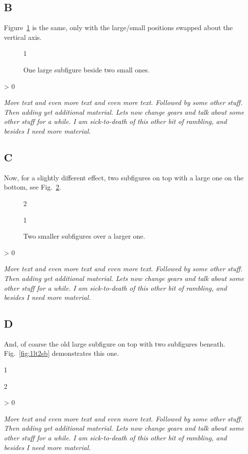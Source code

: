 \documentclass{aiaa}%
\makeatletter
\newlength{\subfigwidth}%
\newlength{\subfigcolsep}%
\newcounter{numrepeat}
\newcommand{\replicate}[2]{\par
 \setcounter{numrepeat}{#1}\relax
 \@whilenum \value{numrepeat} > 0 \do
  {{#2}\addtocounter{numrepeat}{-1}}\par}
\newcommand{\filler}%
  {\em More text and even more text and even more text.
   Followed by some other stuff.
   Then adding yet additional material.
   Lets now change gears and talk about some other stuff for a while.
   I am sick-to-death of this other bit of rambling,
   and besides I need more material.}
\makeatother
\begin{document}
\subsection{B}

Figure~\ref{fig:1l2s} is the same, only with the large/small
positions swapped about the vertical axis.
\begin{figure}[htb!]
  \setlength{\subfigwidth}{.716\linewidth}%
  \addtolength{\subfigwidth}{-.5\subfigcolsep}
  \begin{minipage}[b]{\subfigwidth}
  \end{minipage}
  \addtolength{\subfigwidth}{.5\subfigcolsep}
  \addtolength{\subfigwidth}{-\linewidth}
  \setlength{\subfigwidth}{-\subfigwidth}
  \addtolength{\subfigwidth}{-.5\subfigcolsep}
  \begin{minipage}[b]{\subfigwidth}
    \begin{subfigmatrix}{1}
    \end{subfigmatrix}
  \end{minipage}
  \caption{One large subfigure beside two small ones.}
  \label{fig:1l2s}
\end{figure}
\replicate{1}{\filler}

\subsection{C}

Now, for a slightly different effect, two subfigures on top with
a large one on the bottom, see Fig.~\ref{fig:2st1l}.
\begin{figure}[htb!]
  \begin{subfigmatrix}{2}
  \end{subfigmatrix}%
  \begin{subfigmatrix}{1}
    \centering{}
  \end{subfigmatrix}
  \caption{Two smaller subfigures over a larger one.}
  \label{fig:2st1l}
\end{figure}
\replicate{1}{\filler}

\subsection{D}

And, of coarse the old large subfigure on top with
two subfigures beneath. Fig.~\ref{fig:1lt2sb} demonstrates
this one.
\begin{figure*}[htb!]
  \begin{subfigmatrix}{1}
  \end{subfigmatrix}
  \begin{subfigmatrix}{2}
  \end{subfigmatrix}
  \caption{One large subfigure above two smaller ones.}
  \label{fig:1lt2sb}
\end{figure*}
\replicate{2}{\filler}
\end{document}
